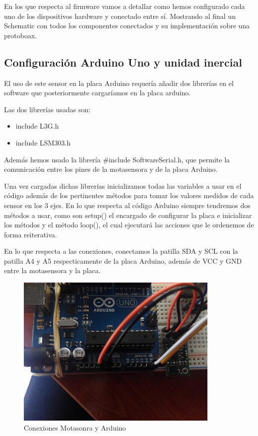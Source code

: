 		En los que respecta al firmware vamos a detallar como hemos configurado cada uno de los dispositivos hardware y conectado entre sí. Mostrando al final un Schematic con todos los componentes conectados y su implementación sobre una protoboax.
		
		\subsection{Configuración Arduino Uno y unidad inercial}
		
			El uso de este sensor en la placa Arduino requería a\~nadir dos librerías en el software que posteriormente cargaríamos en la placa arduino.
			
			Las dos librerías usadas son:
			
			\begin{itemize}	
				
				\item include L3G.h
				
				\item include LSM303.h
				
			\end{itemize}
			
			
			Además hemos usado la librería \#include SoftwareSerial.h, que permite la comunicación entre los pines de la motasensora y de la placa Arduino.
			
			Una vez cargadas dichas librerías inicializamos todas las variables a usar en el código además de los pertinentes métodos para tomar los valores medidos de cada sensor en los 3 ejes. En lo que respecta al código Arduino siempre tendremos dos métodos a usar, como son setup() el encargado de configurar la placa e inicializar los métodos y el método loop(), el cual ejecutará las acciones que le ordenemos de forma reiterativa.
			
			En lo que respecta a las conexiones, conectamos la patilla SDA y SCL con la patilla A4 y A5 respecticamente de la placa Arduino, además de VCC y GND entre la motasensora y la placa.
			
			\begin{figure}[h]
				\centering
				\includegraphics{imagenes/ConfMota.jpg}
				\caption{Conexiones Motasonra y Arduino}
				\label{contexto:figura}
			\end{figure}
			
